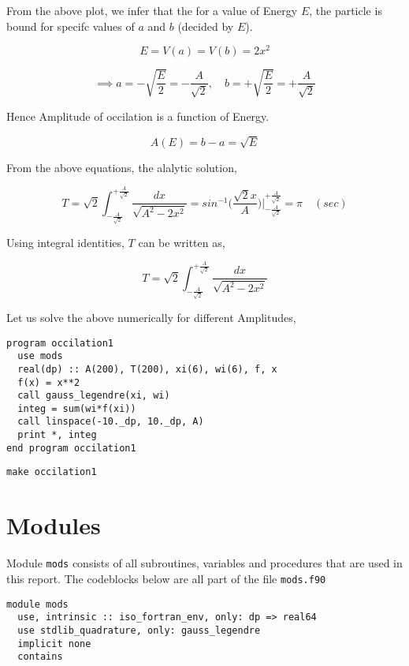 \documentclass[a4paper,11pt,twoside]{article}
\begin{document}
From the above plot, we infer that the for a value of Energy \(E\), the particle is bound for specifc values of \(a\) and \(b\) (decided by \(E\)).

$$
E = V(a)=V(b) = 2x^2
$$

$$
 \implies a = -\sqrt{\frac{E}{2}} = -\frac{A}{\sqrt{2}}, \quad b = +\sqrt{\frac{E}{2}} = +\frac{A}{\sqrt{2}}
$$

Hence Amplitude of occilation is a function of Energy.

$$
A(E) = b-a = \sqrt{E}
$$


\clearpage

From the above equations, the alalytic solution,


$$
T = \sqrt{2}\int_{-\frac{A}{\sqrt{2}}}^{+\frac{A}{\sqrt{2}}} \frac{dx}{\sqrt{A^2-2x^2}} = sin^{-1}{\Big(\frac{\sqrt{2}x}{A}\Big)} \Big|_{-\frac{A}{\sqrt{2}}}^{+\frac{A}{\sqrt{2}}} = \pi \quad (sec)
$$

Using integral identities,  \(T\) can be written as,

$$
T = \sqrt{2}\int_{- \frac{A}{\sqrt2}}^{+ \frac{A}{\sqrt2}} \frac{dx}{\sqrt{A^2-2x^2}}
$$

Let us solve the above numerically for different Amplitudes,

\begin{verbatim}
program occilation1
  use mods
  real(dp) :: A(200), T(200), xi(6), wi(6), f, x
  f(x) = x**2
  call gauss_legendre(xi, wi)
  integ = sum(wi*f(xi))
  call linspace(-10._dp, 10._dp, A)
  print *, integ
end program occilation1
\end{verbatim}

\begin{verbatim}
make occilation1
\end{verbatim}

\clearpage

\section{Modules}
\label{sec:orgb28e08b}

Module \texttt{mods} consists of all subroutines, variables and procedures that are used in this report. The codeblocks below are all part of the file \texttt{mods.f90}

\begin{verbatim}
module mods
  use, intrinsic :: iso_fortran_env, only: dp => real64
  use stdlib_quadrature, only: gauss_legendre
  implicit none
  contains
\end{verbatim}
\end{document}
